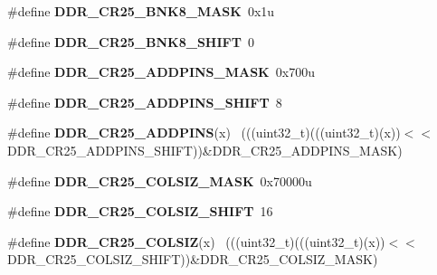 \begin{DoxyCompactItemize}
\item 
\hypertarget{group___d_d_r___register___masks_ga629b73cac4054f6e91cc8926bcd4cb6f}{}\#define {\bfseries D\+D\+R\+\_\+\+C\+R25\+\_\+\+B\+N\+K8\+\_\+\+M\+A\+S\+K}~0x1u\label{group___d_d_r___register___masks_ga629b73cac4054f6e91cc8926bcd4cb6f}

\item 
\hypertarget{group___d_d_r___register___masks_ga6f49e965be6acdc65cc6e02665b3b330}{}\#define {\bfseries D\+D\+R\+\_\+\+C\+R25\+\_\+\+B\+N\+K8\+\_\+\+S\+H\+I\+F\+T}~0\label{group___d_d_r___register___masks_ga6f49e965be6acdc65cc6e02665b3b330}

\item 
\hypertarget{group___d_d_r___register___masks_ga0a5cbb2154c170678c6197fdd9c3dea9}{}\#define {\bfseries D\+D\+R\+\_\+\+C\+R25\+\_\+\+A\+D\+D\+P\+I\+N\+S\+\_\+\+M\+A\+S\+K}~0x700u\label{group___d_d_r___register___masks_ga0a5cbb2154c170678c6197fdd9c3dea9}

\item 
\hypertarget{group___d_d_r___register___masks_ga5976c68539d55137f706975e0e0bca0e}{}\#define {\bfseries D\+D\+R\+\_\+\+C\+R25\+\_\+\+A\+D\+D\+P\+I\+N\+S\+\_\+\+S\+H\+I\+F\+T}~8\label{group___d_d_r___register___masks_ga5976c68539d55137f706975e0e0bca0e}

\item 
\hypertarget{group___d_d_r___register___masks_ga915a144579ccc72fe4e57f41e73a043f}{}\#define {\bfseries D\+D\+R\+\_\+\+C\+R25\+\_\+\+A\+D\+D\+P\+I\+N\+S}(x)                                        ~(((uint32\+\_\+t)(((uint32\+\_\+t)(x))$<$$<$D\+D\+R\+\_\+\+C\+R25\+\_\+\+A\+D\+D\+P\+I\+N\+S\+\_\+\+S\+H\+I\+F\+T))\&D\+D\+R\+\_\+\+C\+R25\+\_\+\+A\+D\+D\+P\+I\+N\+S\+\_\+\+M\+A\+S\+K)\label{group___d_d_r___register___masks_ga915a144579ccc72fe4e57f41e73a043f}

\item 
\hypertarget{group___d_d_r___register___masks_ga06aecbbc80dde72889c5fb6837c7d7ed}{}\#define {\bfseries D\+D\+R\+\_\+\+C\+R25\+\_\+\+C\+O\+L\+S\+I\+Z\+\_\+\+M\+A\+S\+K}~0x70000u\label{group___d_d_r___register___masks_ga06aecbbc80dde72889c5fb6837c7d7ed}

\item 
\hypertarget{group___d_d_r___register___masks_ga3bf6a87da1ec41f30edb86b4d3acf97e}{}\#define {\bfseries D\+D\+R\+\_\+\+C\+R25\+\_\+\+C\+O\+L\+S\+I\+Z\+\_\+\+S\+H\+I\+F\+T}~16\label{group___d_d_r___register___masks_ga3bf6a87da1ec41f30edb86b4d3acf97e}

\item 
\hypertarget{group___d_d_r___register___masks_ga823c0fb75b6ac31dc99116a617d8baf8}{}\#define {\bfseries D\+D\+R\+\_\+\+C\+R25\+\_\+\+C\+O\+L\+S\+I\+Z}(x)                                          ~(((uint32\+\_\+t)(((uint32\+\_\+t)(x))$<$$<$D\+D\+R\+\_\+\+C\+R25\+\_\+\+C\+O\+L\+S\+I\+Z\+\_\+\+S\+H\+I\+F\+T))\&D\+D\+R\+\_\+\+C\+R25\+\_\+\+C\+O\+L\+S\+I\+Z\+\_\+\+M\+A\+S\+K)\label{group___d_d_r___register___masks_ga823c0fb75b6ac31dc99116a617d8baf8}


\end{DoxyCompactItemize}
